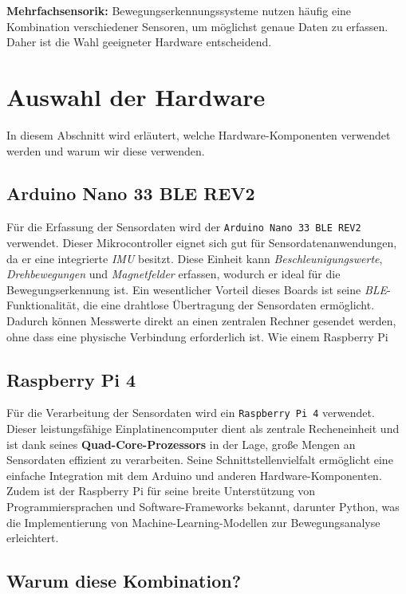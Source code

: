 \textbf{Mehrfachsensorik:} Bewegungserkennungssysteme nutzen häufig eine Kombination verschiedener Sensoren, um möglichst genaue Daten zu erfassen. Daher ist die Wahl geeigneter Hardware entscheidend.



\section{Auswahl der Hardware}
In diesem Abschnitt wird erläutert, welche Hardware-Komponenten  verwendet werden und warum wir diese verwenden.
\subsection{Arduino Nano 33 BLE REV2}

Für die Erfassung der Sensordaten wird der \texttt{Arduino Nano 33 BLE REV2} verwendet. Dieser Mikrocontroller eignet sich gut für Sensordatenanwendungen, da er eine integrierte \emph{\ac{IMU}} besitzt. Diese Einheit kann \emph{Beschleunigungswerte}, \emph{Drehbewegungen} und \emph{Magnetfelder} erfassen, wodurch er ideal für die Bewegungserkennung ist.  
Ein wesentlicher Vorteil dieses Boards ist seine \emph{\ac{BLE}}-Funktionalität, die eine drahtlose Übertragung der Sensordaten ermöglicht. Dadurch können Messwerte direkt an einen zentralen Rechner gesendet werden, ohne dass eine physische Verbindung erforderlich ist. Wie einem Raspberry Pi

\subsection{Raspberry Pi 4}

Für die Verarbeitung der Sensordaten wird ein \texttt{Raspberry Pi 4} verwendet. Dieser leistungsfähige Einplatinencomputer dient als zentrale Recheneinheit und ist dank seines \textbf{Quad-Core-Prozessors} in der Lage, große Mengen an Sensordaten effizient zu verarbeiten. Seine Schnittstellenvielfalt ermöglicht eine einfache Integration mit dem Arduino und anderen Hardware-Komponenten. Zudem ist der Raspberry Pi für seine breite Unterstützung von Programmiersprachen und Software-Frameworks bekannt, darunter Python, was die Implementierung von Machine-Learning-Modellen zur Bewegungsanalyse erleichtert.

\subsection{Warum diese Kombination?}

